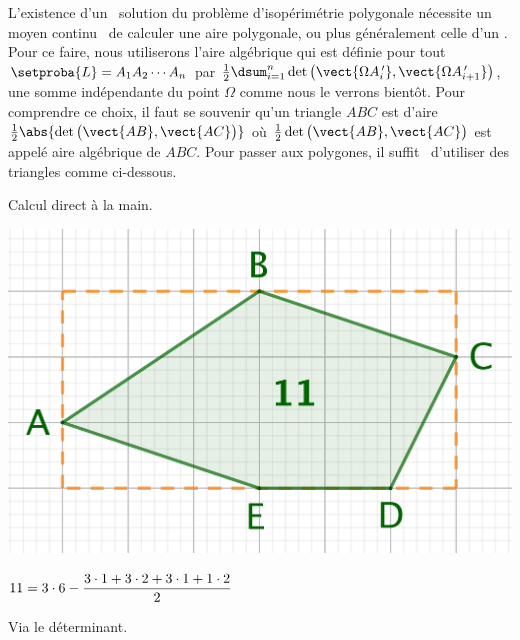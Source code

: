 L'existence d'un \ngone\ solution du problème d'isopérimétrie polygonale nécessite un moyen \og continu \fg\ de calculer une aire polygonale, ou plus généralement celle d'un \ncycle.
Pour ce faire, nous utiliserons l'aire algébrique qui est définie pour tout \ncycle\ $\setproba{L} = A_1 A_2 \cdots A_n$ par $\frac12 \dsum_{i=1}^{n} \det \big( \vect{\Omega \primeit{A}_i} , \vect{\Omega \primeit{A}_{i+1}} \big)$, une somme indépendante du point $\Omega$ comme nous le verrons bientôt.
Pour comprendre ce choix,
il faut se souvenir qu'un triangle $ABC$ est d'aire $\frac12 \abs{ \det \big( \vect{AB} , \vect{AC} \big) }$ où $\frac12 \det \big( \vect{AB} , \vect{AC} \big)$ est appelé aire algébrique de $ABC$. Pour passer aux polygones, il \og suffit \fg\ d'utiliser des triangles comme ci-dessous.


\begin{multicols}{2}
	\small\itshape
    \begin{center}
		Calcul direct à la main.

		\smallskip

        \includegraphics[scale=.35]{content/polygon/alg-area/convex-1.png}

       	\smallskip

		$11 = 3 \cdot 6 - \dfrac{3 \cdot 1 + 3 \cdot 2 + 3 \cdot 1 + 1 \cdot 2}{2} \vphantom{\dfrac{2^M}2}$
    \end{center}

	\columnbreak

    \begin{center}
		Via le déterminant.

		\smallskip


\end{center}
\end{multicols}
